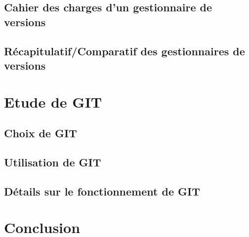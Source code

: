 \subsection{Cahier des charges d'un gestionnaire de versions}



\subsection{Récapitulatif/Comparatif des gestionnaires de versions}



\section{Etude de GIT}

\subsection{Choix de GIT}

\subsection{Utilisation de GIT}

\subsection{Détails sur le fonctionnement de GIT}

\section*{Conclusion}


